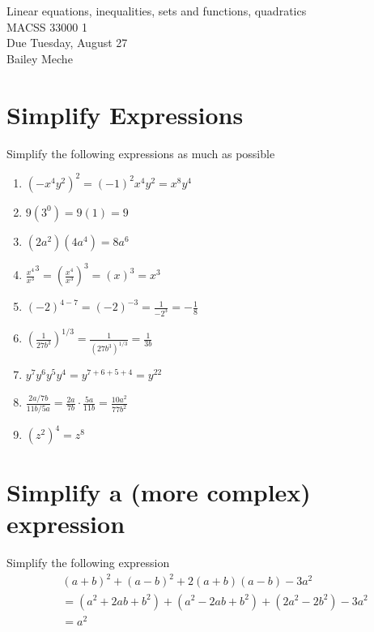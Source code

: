 \documentclass[12pt]{article}
\begin{document}
	\begin{center}
		Linear equations, inequalities, sets and functions, quadratics\\
        MACSS 33000 1 \\
		Due Tuesday, August 27 \\
        Bailey Meche
	\end{center}
 
\section{Simplify Expressions}
Simplify the following expressions as much as possible
\begin{enumerate}
    \item $(-x^4y^2)^2 = (-1)^2x^4y^2= x^8y^4$
    \item $9(3^0) = 9(1) = 9 $
    \item $(2a^2) (4a^4) = 8a^6$
    \item $\frac{x^4}{x^3}^3 = \left(\frac{x^4}{x^3}\right)^3= \left(x\right)^3 = x^3$
    \item $(-2)^{4-7} = (-2)^{-3} = \frac{1}{-2^3} = -\frac{1}{8}$
    \item $\left(\frac{1}{27b^3}\right)^{1/3}= \frac{1}{(27b^3)^{1/3}} = \frac{1}{3b}$
    \item $y^7y^6y^5y^4 = y^{7+6+5+4} = y^{22}$
    \item $\frac{2a/7b}{11b/5a} = \frac{2a}{7b} \cdot \frac{5a}{11b} = \frac{10a^2}{77b^2}$
    \item $(z^2)^4 = z^8$
\end{enumerate}

\section{Simplify a (more complex) expression}
Simplify the following expression
\begin{align*}
    & (a+b)^2 + (a-b)^2 + 2(a+b)(a-b) -3a^2
    \\ &= (a^2 + 2ab + b^2) + (a^2- 2ab +b^2) + (2a^2  - 2b^2) - 3a^2
    \\ &= a^2 
\end{align*}
\end{document}
